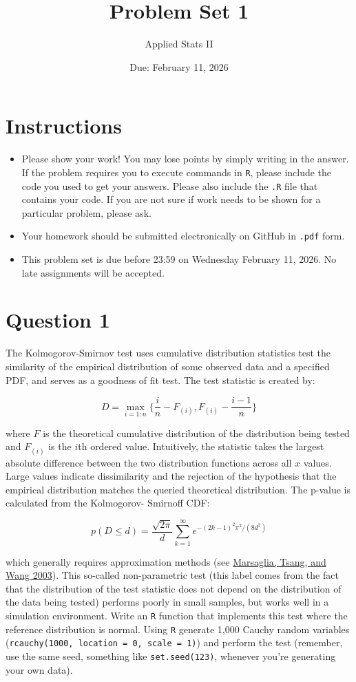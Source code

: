 \documentclass[12pt,letterpaper]{article}
\title{Problem Set 1}
\date{Due: February 11, 2026}
\author{Applied Stats II}
\begin{document}
	\maketitle
	\section*{Instructions}
	\begin{itemize}
	\item Please show your work! You may lose points by simply writing in the answer. If the problem requires you to execute commands in \texttt{R}, please include the code you used to get your answers. Please also include the \texttt{.R} file that contains your code. If you are not sure if work needs to be shown for a particular problem, please ask.
\item Your homework should be submitted electronically on GitHub in \texttt{.pdf} form.
\item This problem set is due before 23:59 on Wednesday February 11, 2026. No late assignments will be accepted.
	\end{itemize}

	\vspace{.25cm}
\section*{Question 1} 
\vspace{.25cm}
\noindent The Kolmogorov-Smirnov test uses cumulative distribution statistics test the similarity of the empirical distribution of some observed data and a specified PDF, and serves as a goodness of fit test. The test statistic is created by:

$$D = \max_{i=1:n} \Big\{ \frac{i}{n}  - F_{(i)}, F_{(i)} - \frac{i-1}{n} \Big\}$$

\noindent where $F$ is the theoretical cumulative distribution of the distribution being tested and $F_{(i)}$ is the $i$th ordered value. Intuitively, the statistic takes the largest absolute difference between the two distribution functions across all $x$ values. Large values indicate dissimilarity and the rejection of the hypothesis that the empirical distribution matches the queried theoretical distribution. The p-value is calculated from the Kolmogorov-
Smirnoff CDF:

$$p(D \leq d)= \frac{\sqrt {2\pi}}{d} \sum _{k=1}^{\infty }e^{-(2k-1)^{2}\pi ^{2}/(8d^{2})}$$


\noindent which generally requires approximation methods (see \href{https://core.ac.uk/download/pdf/25787785.pdf}{Marsaglia, Tsang, and Wang 2003}). This so-called non-parametric test (this label comes from the fact that the distribution of the test statistic does not depend on the distribution of the data being tested) performs poorly in small samples, but works well in a simulation environment. Write an \texttt{R} function that implements this test where the reference distribution is normal. Using \texttt{R} generate 1,000 Cauchy random variables (\texttt{rcauchy(1000, location = 0, scale = 1)}) and perform the test (remember, use the same seed, something like \texttt{set.seed(123)}, whenever you're generating your own data).\\
	
\end{document}
